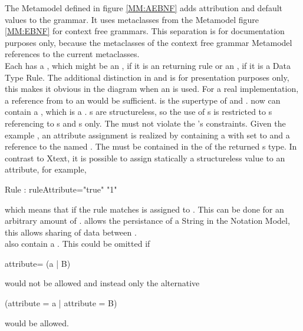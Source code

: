 The Metamodel defined in figure \ref{MM:AEBNF} adds attribution and default values to the grammar. It uses metaclasses from the Metamodel figure \ref{MM:EBNF} for context free grammars. This separation is for documentation purposes only, because the metaclasses of the context free grammar Metamodel references to the current metaclasses. \\
Each  has a , which might be an , if it is an  returning rule or an , if it is a Data Type Rule. The additional distinction in  and  is for presentation purposes only, this makes it obvious in the diagram when an  is used. For a real implementation, a reference from  to an  would be sufficient.  is the supertype of  and .  now can contain a  , which is a .  s are structureless, so the use of s is restricted to  s referencing to s and  s only. The  must not violate the 's constraints. Given the example , an attribute assignment is realized by  containing a   with  set to   and a reference to the   named . The  must be contained in the   of the returned s type. In contrast to Xtext, it is possible to assign statically a structureless value to an attribute, for example, 
\begin{xtxt}
Rule : {ruleAttribute="true"} "1"
\end{xtxt}   
which means that if the rule matches  is assigned to . This can be done for an arbitrary amount of .  allows the persistance of a String in the Notation Model, this allows sharing of data between . \\
 also contain a . This could be omitted if 
\begin{xtxt}
attribute= (a | B)
\end{xtxt}
would not be allowed and instead only the alternative 
\begin{xtxt}
(attribute = a | attribute = B)
\end{xtxt}
would be allowed.
